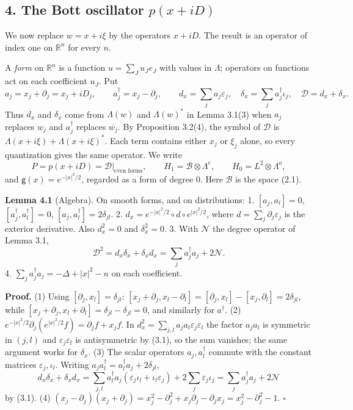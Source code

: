 \documentclass[
  11pt,
]{article}
\begin{document}
\subsection{\texorpdfstring{4. The Bott oscillator
\(p(x+iD)\)}{4. The Bott oscillator p(x+iD)}}\label{the-bott-oscillator-pxid}

We now replace \(w=x+i\xi\) by the operators \(x+iD\). The result is an
operator of index one on \(\mathbb R^n\) for every \(n\).

A \emph{form} on \(\mathbb R^n\) is a function \(u=\sum_Ju_Je_J\) with
values in \(\Lambda\); operators on functions act on each coefficient
\(u_J\). Put \[
a_j=x_j+\partial_j=x_j+iD_j,\qquad a_j^\dagger=x_j-\partial_j,\qquad
d_x=\sum_ja_j\varepsilon_j,\quad \delta_x=\sum_ja_j^\dagger\iota_j,\quad \mathcal D=d_x+\delta_x .
\] Thus \(d_x\) and \(\delta_x\) come from \(\Lambda(w)\) and
\(\Lambda(w)^*\) in Lemma 3.1(3) when \(a_j\) replaces \(w_j\) and
\(a_j^\dagger\) replaces \(\overline{w_j}\). By Proposition 3.2(4), the
symbol of \(\mathcal D\) is \(\Lambda(x+i\xi)+\Lambda(x+i\xi)^*\). Each
term contains either \(x_j\) or \(\xi_j\) alone, so every quantization
gives the same operator. We write \[
P=p(x+iD)=\mathcal D\big|_{\text{even forms}},\qquad H_1=\mathcal B\otimes\Lambda^e,\qquad H_0=L^2\otimes\Lambda^o ,
\] and \(\mathsf g(x)=e^{-|x|^2/2}\), regarded as a form of degree
\(0\). Here \(\mathcal B\) is the space (2.1).

\textbf{Lemma 4.1} (Algebra). On smooth forms, and on distributions: 1.
\([a_j,a_l]=0\), \([a_j^\dagger,a_l^\dagger]=0\),
\([a_j,a_l^\dagger]=2\delta_{jl}\). 2.
\(d_x=e^{-|x|^2/2}\circ d\circ e^{|x|^2/2}\), where
\(d=\sum_j\partial_j\varepsilon_j\) is the exterior derivative. Also
\(d_x^2=0\) and \(\delta_x^2=0\). 3. With \(\mathcal N\) the degree
operator of Lemma 3.1, \[
\mathcal D^2=d_x\delta_x+\delta_xd_x=\sum_ja_j^\dagger a_j+2\mathcal N .
\tag{4.1}
\] 4. \(\sum_ja_j^\dagger a_j=-\Delta+|x|^2-n\) on each coefficient.

\textbf{Proof.} (1) Using \([\partial_j,x_l]=\delta_{jl}\):
\([x_j+\partial_j,x_l-\partial_l]=[\partial_j,x_l]-[x_j,\partial_l]=2\delta_{jl}\),
while \([x_j+\partial_j,x_l+\partial_l]=\delta_{jl}-\delta_{jl}=0\), and
similarly for \(a^\dagger\). (2)
\(e^{-|x|^2/2}\partial_j(e^{|x|^2/2}f)=\partial_jf+x_jf\). In
\(d_x^2=\sum_{j,l}a_ja_l\varepsilon_j\varepsilon_l\) the factor
\(a_ja_l\) is symmetric in \((j,l)\) and \(\varepsilon_j\varepsilon_l\)
is antisymmetric by (3.1), so the sum vanishes; the same argument works
for \(\delta_x\). (3) The scalar operators \(a_j,a_l^\dagger\) commute
with the constant matrices \(\varepsilon_j,\iota_l\). Writing
\(a_ja_l^\dagger=a_l^\dagger a_j+2\delta_{jl}\), \[
d_x\delta_x+\delta_xd_x=\sum_{j,l}a_l^\dagger a_j(\varepsilon_j\iota_l+\iota_l\varepsilon_j)+2\sum_j\varepsilon_j\iota_j=\sum_ja_j^\dagger a_j+2\mathcal N
\] by (3.1). (4)
\((x_j-\partial_j)(x_j+\partial_j)=x_j^2-\partial_j^2+x_j\partial_j-\partial_jx_j=x_j^2-\partial_j^2-1\).
\(\square\)
\end{document}
